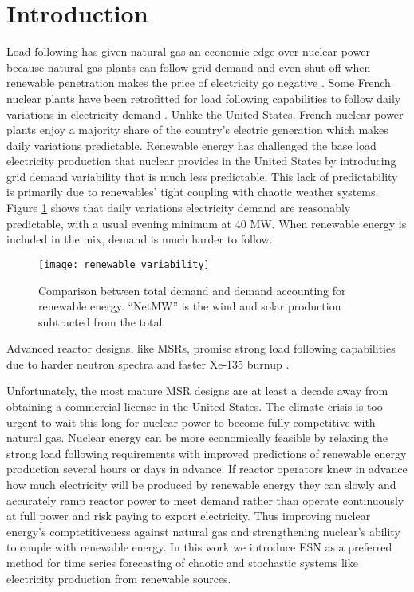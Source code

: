 \section{Introduction}

Load following has given natural gas an economic edge over nuclear power
because natural gas plants can follow grid demand and even shut off when
renewable penetration makes the
price of electricity go negative \cite{keppler_carbon_2011}. Some French nuclear
plants have been retrofitted for load following capabilities to follow daily
variations in electricity demand \cite{lokhov_technical_2011}. Unlike the United
States, French nuclear power plants enjoy a majority share of the country's
electric generation which makes daily variations predictable. Renewable energy
has challenged the base load electricity production that
nuclear provides in the United States by introducing grid demand variability
that is much less predictable. This lack of predictability is primarily due to
renewables' tight coupling with chaotic weather systems. Figure \ref{fig:vre}
shows
that daily variations electricity demand are reasonably predictable, with a
usual evening minimum at 40 MW. When renewable energy is included in the mix,
demand is much harder to follow.

\begin{figure}[h]
  \centering
  \texttt{[image: renewable\_variability]}
  \caption{Comparison between total demand and demand accounting for renewable
   energy. ``NetMW'' is the wind and solar production subtracted from the
   total.}
  \label{fig:vre}
\end{figure}

Advanced reactor designs, like \glspl{MSR}, promise strong load following
capabilities due to harder
neutron spectra and faster Xe-135 burnup \cite{rykhlevskii_impact_2019}.

Unfortunately, the most mature MSR
designs are at least a decade away from obtaining a commercial license in the
United States. The climate crisis is too urgent to wait this long for nuclear
power to become fully competitive with natural gas.
Nuclear energy can be more economically feasible by relaxing the strong load
following requirements
with improved predictions of renewable energy production several hours or days
in advance. If reactor operators knew in advance how much electricity will be
produced by renewable energy they
can slowly and accurately ramp reactor power to meet demand rather than operate
continuously at full power and risk paying to export electricity. Thus
improving nuclear energy's comptetitiveness against natural gas and
strengthening nuclear's ability to couple with renewable energy.
In this work we introduce \acrfull{ESN} as a preferred method for time
series forecasting of chaotic and stochastic systems like electricity
production from renewable sources.
